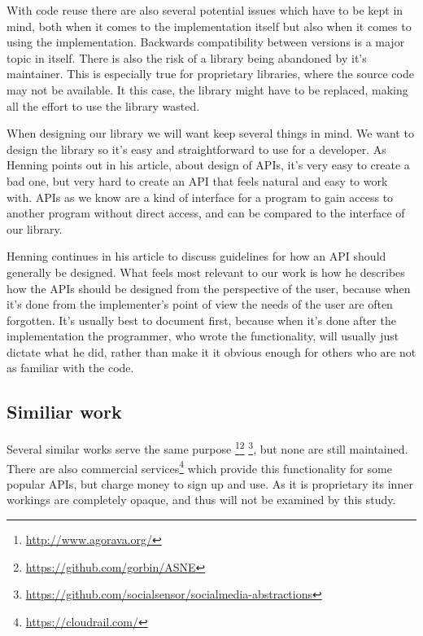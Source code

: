 \documentclass{sigchi}
\begin{document}
With code reuse there are also several potential issues which have to be kept in mind, both when it comes to the implementation itself but also 
when it comes to using the implementation. Backwards compatibility between versions is a major topic in itself\cite{raemaekers2012measuring}. There 
is also the risk of a library being abandoned by it’s maintainer. This is especially true for proprietary libraries, where the source code may not 
be available. It this case, the library might have to be replaced, making all the effort to use the library wasted.

When designing our library we will want keep several things in mind. We want to design the library so it’s easy and straightforward to use for a 
developer. As Henning points out in his article\cite{Henning:2007:ADM:1255421.1255422}, about design of APIs, it’s very easy to create a bad one, 
but very hard to create an API that feels natural and easy to work with. APIs as we know are a kind of interface for a program to gain access to 
another program without direct access, and can be compared to the interface of our library.

Henning continues in his article to discuss guidelines for how an API should generally be designed. What feels most relevant to our work is how 
he describes how the APIs should be designed from the perspective of the user, because when it’s done from the implementer's point of view the 
needs of the user are often forgotten. It’s usually best to document first, because when it’s done after the implementation the programmer, who 
wrote the functionality, will usually just dictate what he did, rather than make it it obvious enough for others who are not as familiar with the code. 

\subsection{Similiar work}
Several similar works serve the same purpose \footnote{\url{http://www.agorava.org/}}\footnote{\url{https://github.com/gorbin/ASNE}}
\footnote{\url{https://github.com/socialsensor/socialmedia-abstractions}}, but none are still maintained. There are also commercial 
services\footnote{\url{https://cloudrail.com/}} which provide this functionality for some popular APIs, but charge money to sign up
and use. As it is proprietary its inner workings are completely opaque, and thus will not be examined by this study.




\end{document}
